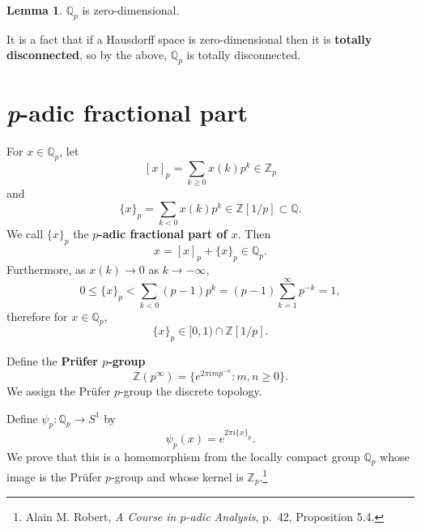 \documentclass{article}
\theoremstyle{definition}
\newtheorem{lemma}[theorem]{Lemma}
\theoremstyle{definition}
\begin{document}
\begin{lemma}
$\mathbb{Q}_p$ is zero-dimensional.
\end{lemma}

It is a fact that if a Hausdorff space is zero-dimensional then it is \textbf{totally disconnected}, so
by the above, $\mathbb{Q}_p$ is totally disconnected.



\section{{\em p}-adic fractional part}
For $x \in \mathbb{Q}_p$, let 
\[
[x]_p = \sum_{k \geq 0} x(k) p^k \in \mathbb{Z}_p
\]
and
\[
\{x\}_p = \sum_{k<0} x(k) p^k \in \mathbb{Z}[1/p] \subset \mathbb{Q}.
\]
We call $\{x\}_p$ the \textbf{$p$-adic fractional part of $x$}.
Then 
\[
x = [x]_p + \{x\}_p \in \mathbb{Q}_p.
\]
Furthermore, as $x(k) \to 0$ as $k \to -\infty$,
\[
0 \leq \{x\}_p < \sum_{k<0} (p-1)p^k = (p-1) \sum_{k=1}^\infty p^{-k} = 1,
\] 
therefore for $x \in \mathbb{Q}_p$,
\[
\{x\}_p \in [0,1) \cap \mathbb{Z}[1/p].
\]

Define the \textbf{Pr\"ufer $p$-group}
\[
\mathbb{Z}(p^\infty) = \{e^{2\pi im p^{-n}} : m,n \geq 0\}.
\]
We assign the Pr\"ufer $p$-group the discrete topology.



Define $\psi_p:\mathbb{Q}_p \to S^1$ by
\[
\psi_p(x) = e^{2\pi i\{x\}_p}.
\]
We prove that this is a homomorphism from the locally compact group $\mathbb{Q}_p$ whose
image is the Pr\"ufer $p$-group and whose kernel is $\mathbb{Z}_p$.\footnote{Alain M. Robert, {\em A Course in $p$-adic Analysis}, p.~42, Proposition 5.4.}
\end{document}
